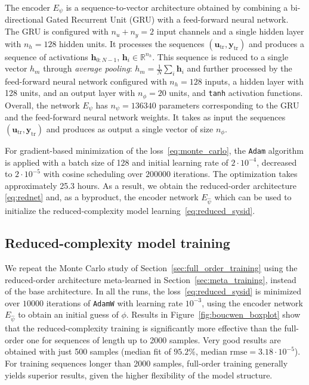 \documentclass{article}
\newcommand{\base}{{base architecture}}
\newcommand{\tr}{\mathrm{tr}}
\newcommand{\seq}[1]{{\mathbf{#1}}}
\newcommand{\R}{\mathbb{R}}
\newcommand{\encpar}{\psi}
\begin{document}
The encoder $E_\psi$ is a sequence-to-vector architecture obtained by combining a bi-directional Gated Recurrent Unit (GRU) with a feed-forward neural network. The GRU is configured with $n_u+n_y=2$ input channels and a single hidden layer with $n_h=128$ hidden units.
It processes the sequences $(\seq u_\tr , \seq y_\tr )$ and produces a sequence of activations  $\seq h_{0:N-1}$, $\seq{h}_i \in \R^{n_h}$. This sequence is reduced to a single vector $h_m$ through \emph{average pooling}: $h_m = \frac{1}{N} \sum_i{\seq {h}_i}$ and further processed by the feed-forward neural network configured with 
$n_h=128$ inputs, a hidden layer with 128 units, and an output layer with 
$n_\phi = 20$ units, and \texttt{tanh} activation functions. Overall, the network $E_\encpar$ has $n_\encpar=136340$ parameters corresponding to the GRU and the feed-forward neural network weights. It takes as input the sequences $(\seq u_\tr , \seq y_\tr )$ and produces as output a single vector of size $n_\phi$.

For gradient-based minimization of the loss~\eqref{eq:monte_carlo}, the \texttt{Adam} algorithm is applied with a batch size of 128 and initial learning rate of $2 \cdot 10^{-4}$, decreased to $2 \cdot 10^{-5}$ with cosine scheduling over $200000$ iterations. The optimization takes approximately 25.3 hours. As a result, we obtain the reduced-order architecture
\eqref{eq:rednet} and, as a byproduct, the encoder network $E_{\hat \encpar}$ which can be used to initialize the reduced-complexity model learning~\eqref{eq:reduced_sysid}.

\subsection{Reduced-complexity model training}
\label{sec:reduced_order_training}
We repeat the Monte Carlo study of Section~\ref{sec:full_order_training} using the reduced-order architecture meta-learned in Section~\ref{sec:meta_training}, instead of the \base. In all the runs, the loss~\eqref{eq:reduced_sysid} is minimized over $10000$ iterations of \texttt{AdamW} with learning rate $10^{-3}$, using the encoder network $E_{\hat \psi}$ to obtain an initial guess of $\phi$. Results in Figure~\ref{fig:boucwen_boxplot} show that the reduced-complexity training is significantly more effective than the full-order one for sequences of length up to 2000 samples. Very good results are obtained with just 500 samples (median fit of $95.2\%$, median $\mathrm{rmse} = 3.18\cdot 10^{-5}$). For training sequences longer than 2000 samples, full-order training generally yields superior results, given the higher flexibility of the model structure. 
\end{document}

